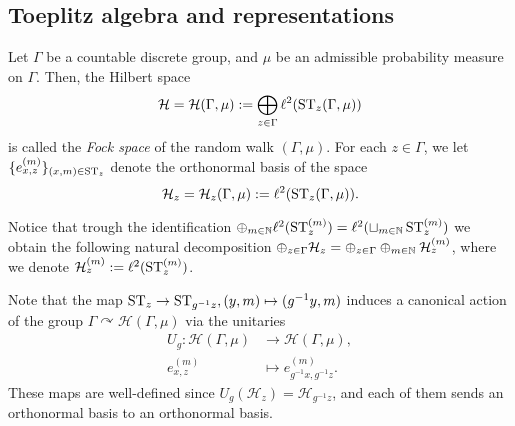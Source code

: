 \documentclass[12pt, class = article, crop = false, a4paper, twoside]{standalone}
\begin{document}
\subsection{Toeplitz algebra and representations}
\begin{definition}

    Let $\Gamma$ be a countable discrete group, and $\mu$ be an admissible probability measure on $\Gamma$. Then, the Hilbert space
    \begin{equation*}
        \mathcal{H} = \mathcal{H}(\Gamma, \mu) := \bigoplus_{z\in\Gamma}\ell^{2}(\operatorname{ST}_{z}(\Gamma, \mu))
    \end{equation*}
    is called the \textit{Fock space} of the random walk $(\Gamma, \mu)$. For each $z\in\Gamma$, we let $\{e^{(m)}_{x, z}\}_{(x, m)\in\operatorname{ST}_{z}}$ denote the orthonormal basis of the space
    \begin{equation*}
        \mathcal{H}_{z} = \mathcal{H}_{z}(\Gamma, \mu) := \ell^{2}(\operatorname{ST}_{z}(\Gamma, \mu)).
    \end{equation*}
\end{definition}

\begin{remark}

    Notice that trough the identification $\oplus_{m\in\mathbb{N}}\ell^{2}(\operatorname{ST}^{(m)}_{z}) = \ell^{2}(\sqcup_{m\in\mathbb{N}}\operatorname{ST}^{(m)}_{z})$
    we obtain the following natural decomposition
    $\oplus_{z\in\Gamma}\mathcal{H}_{z} = \oplus_{z\in\Gamma}\oplus_{m\in\mathbb{N}}\mathcal{H}^{(m)}_{z}$,
    where we denote $\mathcal{H}^{(m)}_{z} := \ell^{2}(\operatorname{ST}^{(m)}_{z})$.
\end{remark}

\begin{remark}

    Note that the map $\operatorname{ST}_{z}\to\operatorname{ST}_{g^{-1}z}, (y, m)\mapsto(g^{-1}y, m)$ induces a canonical action of the group $\Gamma\curvearrowright\mathcal{H}(\Gamma, \mu)$ via the unitaries 
    \begin{equation*}
        \begin{split}
            U_{g}\colon\mathcal{H}(\Gamma, \mu) & \to \mathcal{H}(\Gamma, \mu), \\
            e^{(m)}_{x, z} & \mapsto e^{(m)}_{g^{-1}x, g^{-1}z}.
        \end{split}
    \end{equation*}
    These maps are well-defined since $U_{g}(\mathcal{H}_{z}) = \mathcal{H}_{g^{-1}z}$, and each of them sends an orthonormal basis to an orthonormal basis.
\end{remark}
\end{document}
